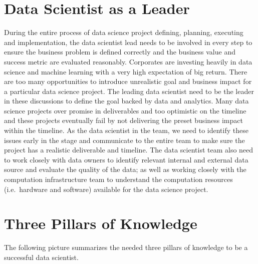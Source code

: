 \documentclass[12pt,]{krantz}
\theoremstyle{definition}
\theoremstyle{definition}
\theoremstyle{definition}
\theoremstyle{remark}
\begin{document}
\section{Data Scientist as a Leader}\label{data-scientist-as-a-leader}

During the entire process of data science project defining, planning,
executing and implementation, the data scientist lead needs to be
involved in every step to ensure the business problem is defined
correctly and the business value and success metric are evaluated
reasonably. Corporates are investing heavily in data science and machine
learning with a very high expectation of big return. There are too many
opportunities to introduce unrealistic goal and business impact for a
particular data science project. The leading data scientist need to be
the leader in these discussions to define the goal backed by data and
analytics. Many data science projects over promise in deliverables and
too optimistic on the timeline and these projects eventually fail by not
delivering the preset business impact within the timeline. As the data
scientist in the team, we need to identify these issues early in the
stage and communicate to the entire team to make sure the project has a
realistic deliverable and timeline. The data scientist team also need to
work closely with data owners to identify relevant internal and external
data source and evaluate the quality of the data; as well as working
closely with the computation infrastructure team to understand the
computation resources (i.e.~hardware and software) available for the
data science project.

\section{Three Pillars of Knowledge}\label{three-pillars-of-knowledge}

The following picture summarizes the needed three pillars of knowledge
to be a successful data scientist.
\end{document}
